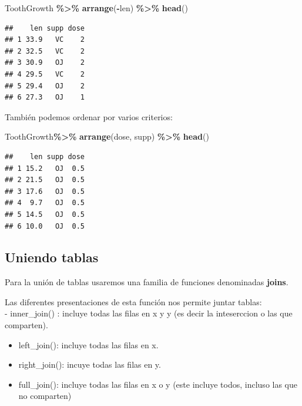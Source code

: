 \documentclass[
]{book}
\newenvironment{Shaded}{\begin{snugshade}}{\end{snugshade}}
\newcommand{\FunctionTok}[1]{\textcolor[rgb]{0.13,0.29,0.53}{\textbf{#1}}}
\newcommand{\NormalTok}[1]{#1}
\newcommand{\SpecialCharTok}[1]{\textcolor[rgb]{0.81,0.36,0.00}{\textbf{#1}}}
\begin{document}
\begin{Shaded}
\begin{Highlighting}[]
\NormalTok{ToothGrowth }\SpecialCharTok{\%\textgreater{}\%} \FunctionTok{arrange}\NormalTok{(}\SpecialCharTok{{-}}\NormalTok{len) }\SpecialCharTok{\%\textgreater{}\%} \FunctionTok{head}\NormalTok{()}
\end{Highlighting}
\end{Shaded}

\begin{verbatim}
##    len supp dose
## 1 33.9   VC    2
## 2 32.5   VC    2
## 3 30.9   OJ    2
## 4 29.5   VC    2
## 5 29.4   OJ    2
## 6 27.3   OJ    1
\end{verbatim}

\hfill\break
También podemos ordenar por varios criterios:

\begin{Shaded}
\begin{Highlighting}[]
\NormalTok{ToothGrowth}\SpecialCharTok{\%\textgreater{}\%}  \FunctionTok{arrange}\NormalTok{(dose, supp) }\SpecialCharTok{\%\textgreater{}\%}  \FunctionTok{head}\NormalTok{()}
\end{Highlighting}
\end{Shaded}

\begin{verbatim}
##    len supp dose
## 1 15.2   OJ  0.5
## 2 21.5   OJ  0.5
## 3 17.6   OJ  0.5
## 4  9.7   OJ  0.5
## 5 14.5   OJ  0.5
## 6 10.0   OJ  0.5
\end{verbatim}

\hfill\break

\subsection{Uniendo tablas}\label{uniendo-tablas}

\hfill\break
Para la unión de tablas usaremos una familia de funciones denominadas \textbf{joins}.

Las diferentes presentaciones de esta función nos permite juntar tablas:\\
- inner\_join() : incluye todas las filas en x y y (es decir la inteserccion o las que comparten).

\begin{itemize}
\item
  left\_join(): incluye todas las filas en x.
\item
  right\_join(): incuye todas las filas en y.
\item
  full\_join(): incluye todas las filas en x o y (este incluye todos, incluso las que no comparten)\\
\end{itemize}
\end{document}
